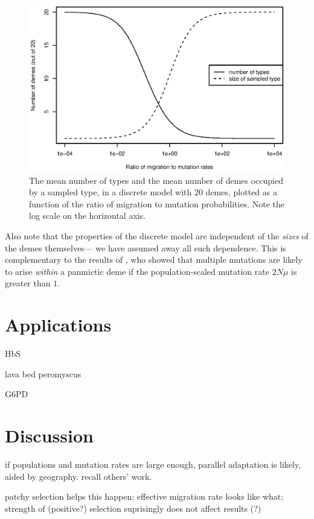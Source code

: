 \documentclass{article}
\begin{document}
{\begin{figure}[ht]
 \begin{center}
 \includegraphics{discrete-by-ratio.eps}
 \caption{ %
 The mean number of types and the mean number of demes occupied by a sampled type, in a discrete model with 20 demes,
 plotted as a function of the ratio of migration to mutation probabilities.
 Note the log scale on the horizontal axis.
 \label{fig:discbyratio}
 }
 \end{center}
\end{figure}

Also note that the properties of the discrete model are independent of the {\em sizes} of the demes themselves--- we have assumed away all such dependence.
This is complementary to the results of \cite{softsweepsII}, who showed that multiple mutations are likely to arise {\em within} a panmictic deme
if the population-scaled mutation rate $2 N \mu$ is greater than $1$.

\section{Applications} 

HbS

lava bed peromyscus

G6PD

\section{Discussion} 

if populations and mutation rates are large enough, parallel adaptation is likely, aided by geography. 
recall others' work. 

patchy selection helps this happen; 
effective migration rate looks like what; 
strength of (positive?) selection suprisingly does not affect results (?) 

}
\end{document}
